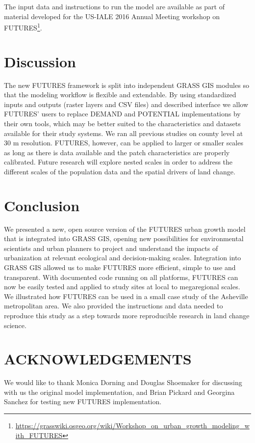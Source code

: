 \documentclass{isprs}
\begin{document}
The input data and instructions to run the model are available as part of material
developed for the US-IALE 2016 Annual Meeting workshop on FUTURES\footnote{\url{https://grasswiki.osgeo.org/wiki/Workshop_on_urban_growth_modeling_with_FUTURES}}.




\section{Discussion}
The new FUTURES framework is split into independent GRASS GIS modules
so that the modeling workflow is flexible and extendable.
By using standardized inputs and outputs (raster layers and CSV files)
and described interface 
we allow FUTURES' users to replace DEMAND and POTENTIAL implementations
by their own tools, which may be better suited to the characteristics and datasets available for their study systems.
We ran all previous studies on county level at 30 m resolution.
FUTURES, however, can be applied to larger or smaller scales
as long as there is data available and the patch characteristics are properly calibrated.
Future research will explore nested scales
in order to 
address the different scales of the population data
and the spatial drivers of land change.

\section{Conclusion}
We presented a new, open source version of the FUTURES urban growth model that is 
integrated into GRASS GIS,
opening new possibilities
for environmental scientists
and urban planners to 
project and understand the impacts of urbanization at relevant ecological and decision-making scales.
Integration into GRASS GIS allowed us to make FUTURES more efficient,
simple to use and transparent.
With documented code running on all platforms, FUTURES can now be easily tested
and applied to study sites at local to megaregional scales.
We illustrated how FUTURES can be used in a small case study of the Asheville metropolitan area.
We also provided the instructions and data 
needed to reproduce this study 
as a step towards more reproducible research in land change science.


\section*{ACKNOWLEDGEMENTS}\label{ACKNOWLEDGEMENTS}
We would like to thank Monica Dorning and Douglas Shoemaker
for discussing with us the original model implementation, and Brian Pickard and Georgina Sanchez for testing new FUTURES implementation.

 {%
 	\begin{spacing}{0.9}%
 	\end{spacing}
 }
\end{document}
